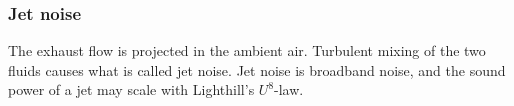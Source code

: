 \subsubsection{Jet noise }
The exhaust flow is projected in the ambient air. Turbulent mixing of the two
fluids causes what is called jet noise. Jet noise is broadband noise, and the
sound power of a jet may scale with Lighthill's $U^8$-law.









%
%
%
%
%
%
%
%
